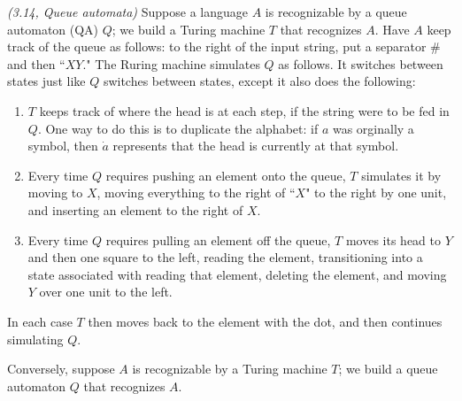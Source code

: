 \pagebreak

\begin{problem}{\it (3.14, Queue automata)}
Suppose a language $A$ is recognizable by a queue automaton (QA) $Q$; we build a Turing machine $T$ that recognizes $A$. Have $A$ keep track of the queue as follows: to the right of the input string, put a separator $\#$ and then ``$XY$." The Ruring machine simulates $Q$ as follows. It switches between states just like $Q$ switches between states, except it also does the following:
\begin{enumerate}
\item $T$ keeps track of where the head is at each step, if the string were to be fed in $Q$. One way to do this is to duplicate the alphabet: if $a$ was orginally a symbol, then $\dot{a}$ represents that the head is currently at that symbol.
\item Every time $Q$ requires pushing an element onto the queue, $T$ simulates it by moving to $X$, moving everything to the right of ``$X$" to the right by one unit, and inserting an element to the right of $X$.
\item Every time $Q$ requires pulling an element off the queue, $T$ moves its head to $Y$ and then one square to the left, reading the element, transitioning into a state associated with reading that element, deleting the element, and moving $Y$ over one unit to the left.
\end{enumerate}
In each case $T$ then moves back to the element with the dot, and then continues simulating $Q$.

Conversely, suppose $A$ is recognizable by a Turing machine $T$; we build a queue automaton $Q$ that recognizes $A$.


\end{problem}
